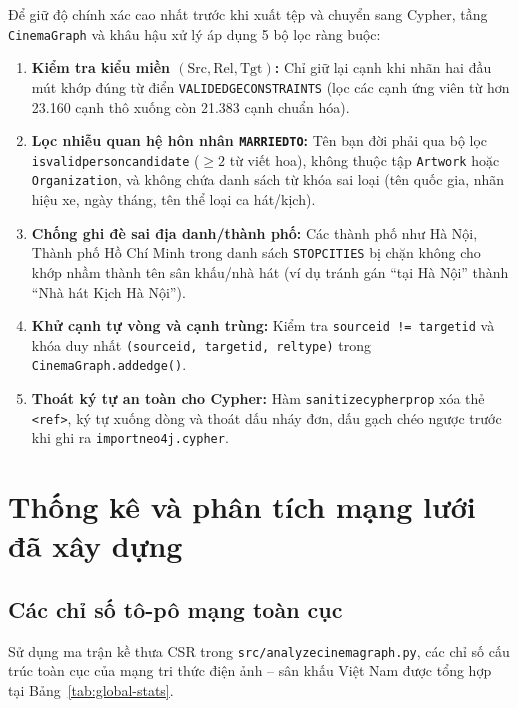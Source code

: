 \documentclass[12pt,a4paper]{article}
\renewcommand{\_}{\oldunderscore\hspace{0pt}}
\begin{document}
Để giữ độ chính xác cao nhất trước khi xuất tệp và chuyển sang Cypher, tầng \texttt{CinemaGraph} và khâu hậu xử lý áp dụng 5 bộ lọc ràng buộc:
\begin{enumerate}
  \item \textbf{Kiểm tra kiểu miền $(\text{Src}, \text{Rel}, \text{Tgt})$:} Chỉ giữ lại cạnh khi nhãn hai đầu mút khớp đúng từ điển \texttt{VALID\_EDGE\_CONSTRAINTS} (lọc các cạnh ứng viên từ hơn 23.160 cạnh thô xuống còn 21.383 cạnh chuẩn hóa).
  \item \textbf{Lọc nhiễu quan hệ hôn nhân \texttt{MARRIED\_TO}:} Tên bạn đời phải qua bộ lọc \texttt{is\_valid\_person\_candidate} ($\ge 2$ từ viết hoa), không thuộc tập \texttt{Artwork} hoặc \texttt{Organization}, và không chứa danh sách từ khóa sai loại (tên quốc gia, nhãn hiệu xe, ngày tháng, tên thể loại ca hát/\allowbreak kịch).
  \item \textbf{Chống ghi đè sai địa danh/\allowbreak thành phố:} Các thành phố như Hà Nội, Thành phố Hồ Chí Minh trong danh sách \texttt{STOP\_CITIES} bị chặn không cho khớp nhầm thành tên sân khấu/\allowbreak nhà hát (ví dụ tránh gán ``tại Hà Nội'' thành ``Nhà hát Kịch Hà Nội'').
  \item \textbf{Khử cạnh tự vòng và cạnh trùng:} Kiểm tra \texttt{source\_id != target\_id} và khóa duy nhất \texttt{(source\_id, target\_id, rel\_type)} trong \texttt{CinemaGraph.\allowbreak add\_edge()}.
  \item \textbf{Thoát ký tự an toàn cho Cypher:} Hàm \texttt{sanitize\_cypher\_prop} xóa thẻ \texttt{<ref>}, ký tự xuống dòng và thoát dấu nháy đơn, dấu gạch chéo ngược trước khi ghi ra \texttt{import\_neo4j.cypher}.
\end{enumerate}

\section{Thống kê và phân tích mạng lưới đã xây dựng}

\subsection{Các chỉ số tô-pô mạng toàn cục}

Sử dụng ma trận kề thưa CSR trong \texttt{src/\allowbreak analyze\_cinema\_graph.py}, các chỉ số cấu trúc toàn cục của mạng tri thức điện ảnh -- sân khấu Việt Nam được tổng hợp tại Bảng~\ref{tab:global-stats}.
\end{document}
